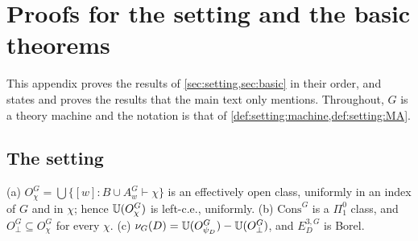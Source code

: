 \section{Proofs for the setting and the basic theorems}\label{app:basic}

This appendix proves the results of \cref{sec:setting,sec:basic} in their order, and states and proves the results that the main text only mentions. Throughout, $G$ is a theory machine and the notation is that of \cref{def:setting:machine,def:setting:MA}.

\subsection{The setting}\label{app:setting}

\begin{lemma}\label{lem:setting:measurable}
(a) $O^G_\chi=\bigcup\{[w]:B\cup A^G_w\vdash\chi\}$ is an effectively open class, uniformly in an index of $G$ and in $\chi$; hence $\mathbb{U}(O^G_\chi)$ is left-c.e., uniformly. (b) $\mathrm{Cons}^G$ is a $\Pi^0_1$ class, and $O^G_\bot\subseteq O^G_\chi$ for every $\chi$. (c) $\nu_G(D)=\mathbb{U}(O^G_{\psi_D})-\mathbb{U}(O^G_\bot)$, and $E^{3,G}_D$ is Borel.
\end{lemma}

